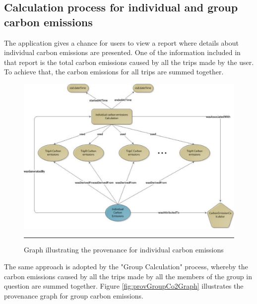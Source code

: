 \subsection{Calculation process for individual and group carbon emissions}

The application gives a chance for users to view a report where details about individual carbon emissions are presented. One of the information included in that report is the total carbon emissions caused by all the trips made by the user. To achieve that, the carbon emissions for all trips are summed together.

\begin{figure}[htbp]
	\centering
		\includegraphics[scale=0.60]{./Figures/chapter3/figure5.pdf}
		\rule{35em}{0.5pt}
	\caption[Graph illustrating the provenance for individual carbon emissions]{Graph illustrating the provenance for individual carbon emissions}
	\label{fig:provIndividualCo2Graph}
\end{figure}

The same approach is adopted by the "Group Calculation" process, whereby the carbon emissions caused by all the trips made by all the members of the group in question are summed together. Figure \ref{fig:provGroupCo2Graph} illustrates the provenance graph for group carbon emissions.

